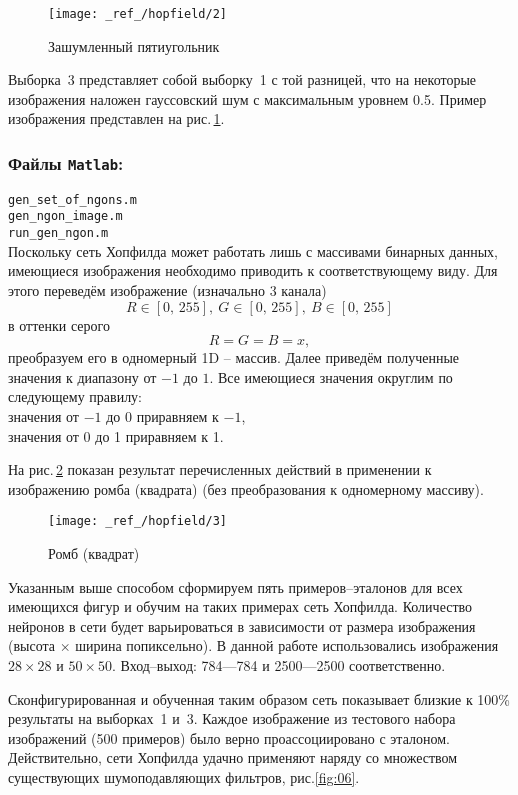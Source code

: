 \documentclass[12pt,a4paper]{article}
\begin{document}
\begin{figure}[H]
	\centering
	\texttt{[image: \_ref\_/hopfield/2]}					
	\caption{Зашумленный пятиугольник}
	\label{fig:04}
\end{figure}

\noindent
Выборка \textnumero\,3 представляет собой выборку \textnumero\,1 
с той разницей, что на некоторые изображения наложен гауссовский шум с максимальным уровнем 0.5. Пример изображения представлен 
на рис.\,\ref{fig:04}.

\subsubsection*{Файлы \texttt{Matlab}:}
\verb|gen_set_of_ngons.m|\\
\verb|gen_ngon_image.m|\\
\verb|run_gen_ngon.m|\\[6pt]

\noindent
Поскольку сеть Хопфилда может работать лишь с массивами бинарных 
данных, имеющиеся изображения необходимо приводить к соответствующему виду. Для этого переведём изображение (изначально 3 канала)
$$
R\in[0,\,255],~G\in[0,\,255],~B\in[0,\,255]
$$
в оттенки серого 
$$
R = G = B = x,
$$ 
преобразуем его в одномерный 1D -- массив. 
Далее приведём полученные значения к диапазону от $-1$ до $1$. 
Все имеющиеся значения округлим по следующему правилу:\\ 
значения от $-1$ до 0 приравняем к $-1$, \\
значения от 0 до 1 приравняем к 1.

На рис.\,\ref{fig:05} показан результат перечисленных действий в применении к изображению ромба (квадрата) (без преобразования к одномерному массиву).

\begin{figure}[H]
	\centering
	\texttt{[image: \_ref\_/hopfield/3]}		
	\caption{Ромб (квадрат)}
	\label{fig:05}
\end{figure}

Указанным выше способом сформируем пять примеров--эталонов для 
всех имеющихся фигур и обучим на таких примерах сеть Хопфилда. 
Количество нейронов в сети будет варьироваться в зависимости от 
размера изображения (высота $\times$ ширина попиксельно). 
В данной работе использовались изображения 
$28\times28$ и $50\times50$. Вход--выход: 784---784 и 2500---2500 соответственно. 

Сконфигурированная и обученная таким образом сеть показывает близкие к 100\% результаты на выборках \textnumero\,1 и \textnumero\,3. 
Каждое изображение из тестового набора изображений (500 примеров) было верно проассоциировано с эталоном. Действительно, сети Хопфилда удачно применяют наряду со множеством существующих шумоподавляющих фильтров, рис.\ref{fig:06}.
\end{document}
